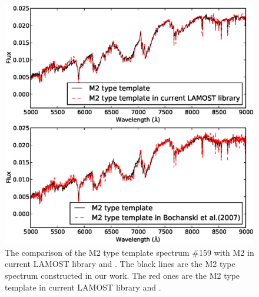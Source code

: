 \documentclass[manuscript]{aastex}
\begin{document}
 \begin{figure}
   \centering
   \includegraphics[width=14cm, angle=0,clip]{f94.eps}
   \caption{The comparison of the M2 type template spectrum \#159 with  M2 in   current LAMOST library and \citet{bochanski2007low}.
The black lines are the M2 type spectrum constructed in our work.
The red ones are the M2 type template in   current LAMOST library and \citet{bochanski2007low}.
   }
   \label{Fig94}
\end{figure}

\end{document}
